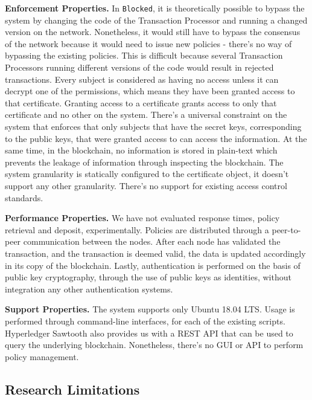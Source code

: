 \textbf{Enforcement Properties.} In \texttt{Blocked}, it is theoretically possible to bypass the system by changing the code of the Transaction Processor and running a changed version on the network. Nonetheless, it would still have to bypass the consensus of the network because it would need to issue new policies - there's no way of bypassing the existing policies. This is difficult because several Transaction Processors running different versions of the code would result in rejected transactions. Every subject is considered as having no access unless it can decrypt one of the permissions, which means they have been granted access to that certificate. Granting access to a certificate grants access to only that certificate and no other on the system. There's a universal constraint on the system that enforces that only subjects that have the secret keys, corresponding to the public keys, that were granted access to can access the information. At the same time, in the blockchain, no information is stored in plain-text which prevents the leakage of information through inspecting the blockchain. The system granularity is statically configured to the certificate object, it doesn't support any other granularity. There's no support for existing access control standards.

\textbf{Performance Properties.} We have not evaluated response times, policy retrieval and deposit, experimentally. Policies are distributed through a peer-to-peer communication between the nodes. After each node has validated the transaction, and the transaction is deemed valid, the data is updated accordingly in its copy of the blockchain. Lastly, authentication is performed on the basis of public key cryptography, through the use of public keys as identities, without integration any other authentication systems.

\textbf{Support Properties.} The system supports only Ubuntu 18.04 LTS. Usage is performed through command-line interfaces, for each of the existing scripts. Hyperledger Sawtooth also provides us with a REST API that can be used to query the underlying blockchain. Nonetheless, there's no GUI or API to perform policy management.

\subsection{Research Limitations}
\label{sec:eval-limitations}

